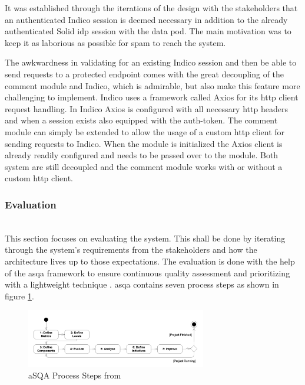 It was established through the iterations of the design with the stakeholders that an authenticated Indico session is deemed necessary in addition to the already authenticated Solid \gls{idp} session with the data pod. The main motivation was to keep it as laborious as possible for spam to reach the system.

The awkwardness in validating for an existing Indico session and then be able to send requests to a protected endpoint comes with the great decoupling of the comment module and Indico, which is admirable, but also make this feature more challenging to implement. Indico uses a framework called Axios \cite{axios} for its \gls{http} client request handling. In Indico Axios is configured with all necessary \gls{http} headers and when a session exists also equipped with the auth-token. The comment module can simply be extended to allow the usage of a custom \gls{http} client for sending requests to Indico. When the module is initialized the Axios client is already readily configured and needs to be passed over to the module. Both system are still decoupled and the comment module works with or without a custom \gls{http} client.
\vspace{0.5cm}
\subsubsection{Evaluation}\mbox{}\\

This section focuses on evaluating the system. This shall be done by iterating through the system's requirements from the stakeholders and how the architecture lives up to those expectations. The evaluation is done with the help of the \gls{asqa} framework to ensure continuous quality assessment and prioritizing with a lightweight technique \cite{asqa-paper}.
\gls{asqa} contains seven process steps as shown in figure \ref{fig:asqa-process-steps}.

\begin{figure}[!ht]
    \centering
    \includegraphics[width=0.7\textwidth]{thesis/latex/assets/asqa-process-steps.png}
    \caption{aSQA Process Steps from \cite{asqa-paper}}
    \label{fig:asqa-process-steps}
\end{figure}

